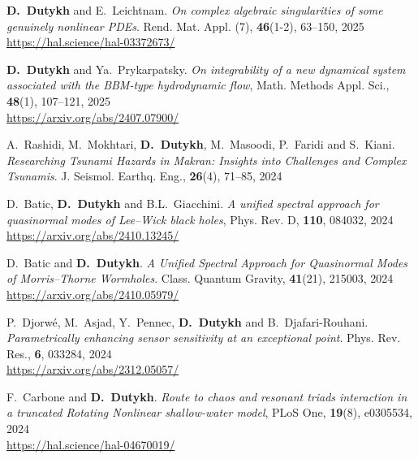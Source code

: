 \begin{etaremune}
  \item \textbf{D.~Dutykh} and E.~Leichtnam. \textit{On complex algebraic singularities of some genuinely nonlinear PDEs}. Rend. Mat. Appl. (7), \textbf{46}(1-2), 63--150, 2025 \\ %
  \url{https://hal.science/hal-03372673/}

  \item \textbf{D.~Dutykh} and Ya.~Prykarpatsky. \textit{On integrability of a new dynamical system associated with the BBM-type hydrodynamic flow}, Math. Methods Appl. Sci., \textbf{48}(1), 107--121, 2025 \\ %
  \url{https://arxiv.org/abs/2407.07900/}



  \item A.~Rashidi, M.~Mokhtari, \textbf{D.~Dutykh}, M.~Masoodi, P.~Faridi and S.~Kiani. \textit{Researching Tsunami Hazards in Makran: Insights into Challenges and Complex Tsunamis}. J. Seismol. Earthq. Eng., \textbf{26}(4), 71--85, 2024 %

  \item D.~Batic, \textbf{D.~Dutykh} and B.L.~Giacchini. \textit{A unified spectral approach for quasinormal modes of Lee--Wick black holes}, Phys. Rev. D, \textbf{110}, 084032, 2024 \\ %
  \url{https://arxiv.org/abs/2410.13245/}

  \item D.~Batic and \textbf{D.~Dutykh}. \textit{A Unified Spectral Approach for Quasinormal Modes of Morris--Thorne Wormholes}. Class. Quantum Gravity, \textbf{41}(21), 215003, 2024 \\ %
  \url{https://arxiv.org/abs/2410.05979/}

  \item P.~Djorw\'e, M.~Asjad, Y.~Pennec, \textbf{D.~Dutykh} and B.~Djafari-Rouhani. \textit{Parametrically enhancing sensor sensitivity at an exceptional point}. Phys. Rev. Res., \textbf{6}, 033284, 2024 \\ %
  \url{https://arxiv.org/abs/2312.05057/}
  
  \item F.~Carbone and \textbf{D.~Dutykh}. \textit{Route to chaos and resonant triads interaction in a truncated Rotating Nonlinear shallow-water model}, PLoS One, \textbf{19}(8), e0305534, 2024 \\ %
  \url{https://hal.science/hal-04670019/}


\end{etaremune}
